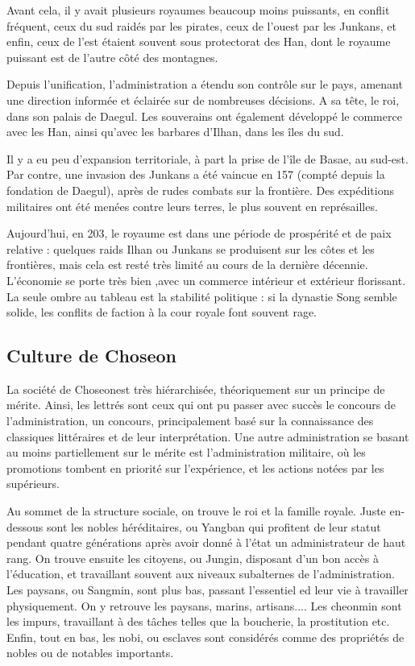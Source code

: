\documentclass[10pt,a4paper]{book}
\newcommand{\nomroyaume}{Choseon}
\begin{document}
Avant cela, il y avait plusieurs royaumes beaucoup moins puissants, en conflit fréquent, ceux du sud raidés par les pirates, ceux de l'ouest par les Junkans, et enfin, ceux de l'est étaient souvent sous protectorat des Han, dont le royaume puissant est de l'autre côté des montagnes.

Depuis l'unification, l'administration a étendu son contrôle sur le pays, amenant une direction informée et éclairée sur de nombreuses décisions. A sa tête, le roi, dans son palais de Daegul. Les souverains ont également développé le commerce avec les Han, ainsi qu'avec les barbares d'Ilhan, dans les îles du sud.

Il y a eu peu d'expansion territoriale, à part la prise de l'île de Basae, au sud-est. Par contre, une invasion des Junkans a été vaincue en 157 (compté depuis la fondation de Daegul), après de rudes combats sur la frontière. Des expéditions militaires ont été menées contre leurs terres, le plus souvent en représailles.

Aujourd'hui, en 203, le royaume est dans une période de prospérité et de paix relative : quelques raids Ilhan ou Junkans se produisent sur les côtes et les frontières, mais cela est resté très limité au cours de la dernière décennie. L'économie se porte très bien ,avec un commerce intérieur et extérieur florissant. La seule ombre au tableau est la stabilité politique : si la dynastie Song semble solide, les conflits de faction à la cour royale font souvent rage.
\subsection{Culture de \nomroyaume}
La société de \nomroyaume est très hiérarchisée, théoriquement sur un principe de mérite. Ainsi, les lettrés sont ceux qui ont pu passer avec succès le concours de l'administration, un concours, principalement basé sur la connaissance des classiques littéraires et de leur interprétation. Une autre administration se basant au moins partiellement sur le mérite est l'administration militaire, où les promotions tombent en priorité sur l'expérience, et les actions notées par les supérieurs. 

Au sommet de la structure sociale, on trouve le roi et la famille royale. Juste en-dessous sont les nobles héréditaires, ou Yangban qui profitent de leur statut pendant quatre générations après avoir donné à l'état un administrateur de haut rang. On trouve ensuite les citoyens, ou Jungin, disposant d'un bon accès à l'éducation, et travaillant souvent aux niveaux subalternes de l'administration. Les paysans, ou Sangmin, sont plus bas, passant l'essentiel ed leur vie à travailler physiquement. On y retrouve les paysans, marins, artisans.... Les cheonmin sont les impurs, travaillant à des tâches telles que la boucherie, la prostitution etc. Enfin, tout en bas, les nobi, ou esclaves sont considérés comme des propriétés de nobles ou de notables importants.
\end{document}
